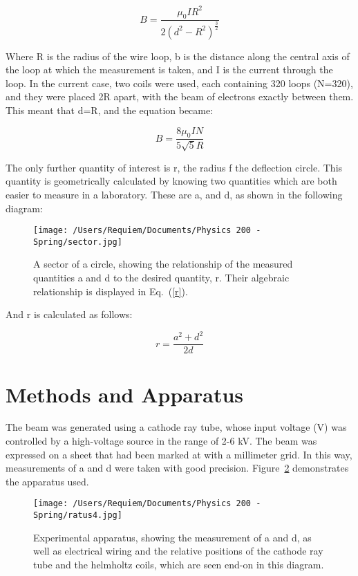 \documentclass[aps,pre,twocolumn,nofootinbib]{revtex4}
\begin{document}
\begin{equation}
\label{bfield}
B=\frac{\mu_0 I R^2}{2(d^2-R^2)^{\frac{3}{2}}}
\end{equation}

Where R is the radius of the wire loop, b is the distance along the central axis of the loop at which the measurement is taken, and I is the current through the loop.  In the current case, two coils were used, each containing 320 loops (N=320), and they were placed 2R apart, with the beam of electrons exactly between them.  This meant that d=R, and the equation became: 

\begin{equation}
\label{bfieldmodified}
B=\frac{8 \mu_0 I N}{5 \sqrt{5} R}
\end{equation}

The only further quantity of interest is r, the radius f the deflection circle.  This quantity is geometrically calculated by knowing two quantities which are both easier to measure in a laboratory.  These are a, and d, as shown in the following diagram: 

\begin{figure}[h]
\centering
\texttt{[image: /Users/Requiem/Documents/Physics 200 - Spring/sector.jpg]} 
\caption{A sector of a circle, showing the relationship of the measured quantities a and d to the desired quantity, r.  Their algebraic relationship is displayed in Eq.~(\ref{r}).  }
\label{graph}
\end{figure}

And r is calculated as follows: 

\begin{equation}
\label{r}
r=\frac{a^2+d^2}{2d}
\end{equation}


\section{Methods and Apparatus}
The beam was generated using a cathode ray tube, whose input voltage (V) was controlled by a high-voltage source in the range of 2-6 kV.  The beam was expressed on a sheet that had been marked at with a millimeter grid.  In this way, measurements of a and d were taken with good precision.   Figure~\ref{ratus} demonstrates the apparatus used.  

\begin{figure}[h]
\centering
\texttt{[image: /Users/Requiem/Documents/Physics 200 - Spring/ratus4.jpg]} 
\caption{Experimental apparatus, showing the measurement of a and d, as well as electrical wiring and the relative positions of the cathode ray tube and the helmholtz coils, which are seen end-on in this diagram.}
\label{ratus}
\end{figure}
\end{document}
